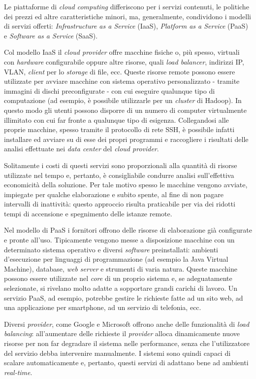 Le piattaforme di \textit{cloud computing} differiscono per i servizi contenuti, le politiche dei prezzi ed altre caratteristiche minori, ma, generalmente, condividono i modelli di 
servizi offerti: \textit{Infrastructure as a Service} (IaaS), \textit{Platform as a Service} (PaaS) e \textit{Software as a Service} (SaaS).

Col modello IaaS il \textit{cloud provider} offre macchine fisiche o, più spesso, virtuali con \textit{hardware} configurabile oppure altre risorse, quali \textit{load balancer}, indirizzi IP, VLAN, 
\textit{client} per lo \textit{storage} di file, ecc. Queste risorse remote possono essere utilizzate per avviare macchine con sistema operativo personalizzato - tramite immagini di dischi 
preconfigurate - con cui eseguire qualunque tipo di computazione (ad esempio, è possibile utilizzarle per un \textit{cluster} di Hadoop). In questo modo gli utenti possono disporre 
di un numero di computer virtualmente illimitato con cui far fronte a qualunque tipo di esigenza. Collegandosi alle proprie macchine, spesso tramite il protocollo di rete SSH, 
è possibile infatti installare ed avviare su di esse dei propri programmi e raccogliere i risultati delle analisi effettuate nei \textit{data center} del \textit{cloud provider}.

Solitamente i costi di questi servizi sono proporzionali alla quantità di risorse utilizzate nel tempo e, pertanto, è consigliabile condurre analisi sull’effettiva economicità 
della soluzione. Per tale motivo spesso le macchine vengono avviate, impiegate per qualche elaborazione e subito spente, al fine di non pagare intervalli di inattività: questo 
approccio risulta praticabile per via dei ridotti tempi di accensione e spegnimento delle istanze remote.

Nel modello di PaaS i fornitori offrono delle risorse di elaborazione già configurate e pronte all’uso. Tipicamente vengono messe a disposizione macchine con un determinato 
sistema operativo e diversi \textit{software} preinstallati: ambienti d’esecuzione per linguaggi di programmazione (ad esempio la Java Virtual Machine), database, \textit{web server} e strumenti
di varia natura. Queste macchine possono essere utilizzate nel \textit{core} di un proprio sistema e, se adeguatamente selezionate, si rivelano molto adatte a sopportare grandi carichi 
di lavoro. Un servizio PaaS, ad esempio, potrebbe gestire le richieste fatte ad un sito web, ad una applicazione per smartphone, ad un servizio di telefonia, ecc.

Diversi \textit{provider}, come Google e Microsoft offrono anche delle funzionalità di \textit{load balancing}: all’aumentare delle richieste il \textit{provider} alloca dinamicamente nuove risorse per 
non far degradare il sistema nelle performance, senza che l’utilizzatore del servizio debba intervenire manualmente. I sistemi sono quindi capaci di scalare automaticamente e, 
pertanto, questi servizi di adattano bene ad ambienti \textit{real-time}.

